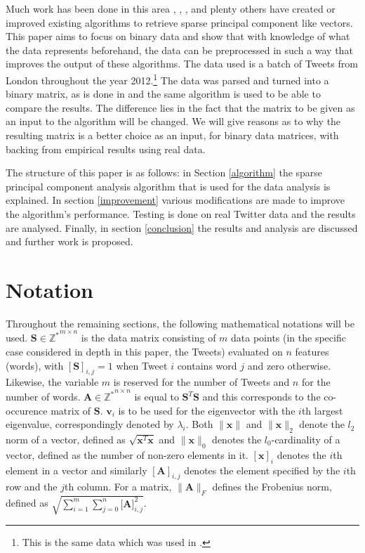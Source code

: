 \documentclass[graybox]{svmult}
\begin{document}
Much work has been done in this area \cite{shen}, \cite{daspremont}, \cite{zou}, \cite{truncpower} and plenty others have created or improved existing algorithms to retrieve sparse principal component like vectors. This paper aims to focus on binary data and show that with knowledge of what the data represents beforehand, the data can be preprocessed in such a way that improves the output of these algorithms. The data used is a batch of Tweets from London throughout the year 2012.\footnote{This is the same data which was used in \cite{microblogs}.} The data was parsed and turned into a binary matrix, as is done in \cite{dimakis} and the same algorithm is used to be able to compare the results. The difference lies in the fact that the matrix to be given as an input to the algorithm will be changed. We will give reasons as to why the resulting matrix is a better choice as an input, for binary data matrices, with backing from empirical results using real data. 

The structure of this paper is as follows: in Section \ref{algorithm} the sparse principal component analysis algorithm that is used for the data analysis is explained. In section \ref{improvement} various modifications are made to improve the algorithm's performance. Testing is done on real Twitter data and the results are analysed. Finally, in section \ref{conclusion} the results and analysis are discussed and further work is proposed. 

\section{Notation}

Throughout the remaining sections, the following mathematical notations will be used. $\mathbf{S} \in \mathbb{Z^*}^{m\times n}$ is the data matrix consisting of $m$ data points (in the specific case considered in depth in this paper, the Tweets) evaluated on $n$ features (words), with $[\mathbf{S}]_{i,j} = 1$ when Tweet $i$ contains word $j$ and zero otherwise. Likewise, the variable $m$ is reserved for the number of Tweets and $n$ for the number of words. $\mathbf{A} \in \mathbb{Z^*}^{n \times n}$ is equal to $\mathbf{S}^T\mathbf{S}$ and this corresponds to the co-occurence matrix of $\mathbf{S}$. $\mathbf{v}_i$ is to be used for the eigenvector with the $i$th largest eigenvalue, correspondingly denoted by $\lambda_i$. Both $\|\mathbf{x}\|$ and $\|\mathbf{x}\|_2$ denote the $l_2$ norm of a vector, defined as $\sqrt{\mathbf{x}^T\mathbf{x}}$ and $\|\mathbf{x}\|_0$ denotes the $l_0$-cardinality of a vector, defined as the number of non-zero elements in it. $[\mathbf{x} ]_i$ denotes the $i$th element in a vector and similarly $[\mathbf{A}]_{i, j}$ denotes the element specified by the $i$th row and the $j$th column. For a matrix, $\|\mathbf{A}\|_F$ defines the Frobenius norm, defined as $\sqrt{\sum^m_{i=1}{\sum_{j=0}^n{\mathbf{[A}]_{i, j}^2}}}$.
\end{document}
